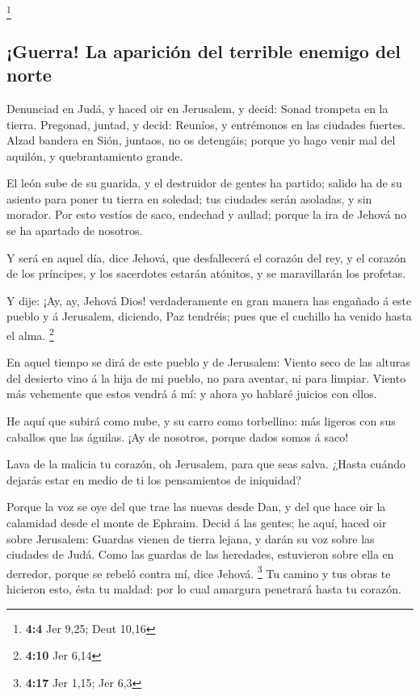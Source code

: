 \footnote{\textbf{4:4} Jer 9,25; Deut 10,16}

\hypertarget{guerra-la-apariciuxf3n-del-terrible-enemigo-del-norte}{%
\subsection{¡Guerra! La aparición del terrible enemigo del
norte}\label{guerra-la-apariciuxf3n-del-terrible-enemigo-del-norte}}

 Denunciad en Judá, y haced oir en Jerusalem, y decid: Sonad
trompeta en la tierra. Pregonad, juntad, y decid: Reuníos, y entrémonos
en las ciudades fuertes.  Alzad bandera en Sión, juntaos, no
os detengáis; porque yo hago venir mal del aquilón, y quebrantamiento
grande.

 El león sube de su guarida, y el destruidor de gentes ha
partido; salido ha de su asiento para poner tu tierra en soledad; tus
ciudades serán asoladas, y sin morador.  Por esto vestíos de
saco, endechad y aullad; porque la ira de Jehová no se ha apartado de
nosotros.

 Y será en aquel día, dice Jehová, que desfallecerá el
corazón del rey, y el corazón de los príncipes, y los sacerdotes estarán
atónitos, y se maravillarán los profetas.

 Y dije: ¡Ay, ay, Jehová Dios! verdaderamente en gran
manera has engañado á este pueblo y á Jerusalem, diciendo, Paz tendréis;
pues que el cuchillo ha venido hasta el alma. \footnote{\textbf{4:10}
  Jer 6,14}

 En aquel tiempo se dirá de este pueblo y de Jerusalem:
Viento seco de las alturas del desierto vino á la hija de mi pueblo, no
para aventar, ni para limpiar.  Viento más vehemente que
estos vendrá á mí: y ahora yo hablaré juicios con ellos.

 He aquí que subirá como nube, y su carro como torbellino:
más ligeros con sus caballos que las águilas. ¡Ay de nosotros, porque
dados somos á saco!

 Lava de la malicia tu corazón, oh Jerusalem, para que seas
salva. ¿Hasta cuándo dejarás estar en medio de ti los pensamientos de
iniquidad?

 Porque la voz se oye del que trae las nuevas desde Dan, y
del que hace oir la calamidad desde el monte de Ephraim. 
Decid á las gentes; he aquí, haced oir sobre Jerusalem: Guardas vienen
de tierra lejana, y darán su voz sobre las ciudades de Judá.
 Como las guardas de las heredades, estuvieron sobre ella
en derredor, porque se rebeló contra mí, dice Jehová. \footnote{\textbf{4:17}
  Jer 1,15; Jer 6,3}  Tu camino y tus obras te hicieron
esto, ésta tu maldad: por lo cual amargura penetrará hasta tu corazón.

